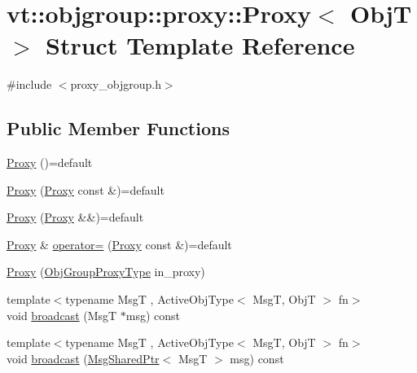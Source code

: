 \hypertarget{structvt_1_1objgroup_1_1proxy_1_1_proxy}{}\section{vt\+:\+:objgroup\+:\+:proxy\+:\+:Proxy$<$ ObjT $>$ Struct Template Reference}
\label{structvt_1_1objgroup_1_1proxy_1_1_proxy}


{\ttfamily \#include $<$proxy\+\_\+objgroup.\+h$>$}

\subsection*{Public Member Functions}
\begin{DoxyCompactItemize}
\item 
\hyperlink{structvt_1_1objgroup_1_1proxy_1_1_proxy_a5450776d9cabb2556765c0d0227c9589}{Proxy} ()=default
\item 
\hyperlink{structvt_1_1objgroup_1_1proxy_1_1_proxy_ad12a9b75a3c4844144d7a159b11af5ec}{Proxy} (\hyperlink{structvt_1_1objgroup_1_1proxy_1_1_proxy}{Proxy} const \&)=default
\item 
\hyperlink{structvt_1_1objgroup_1_1proxy_1_1_proxy_a8711a58bb0444c24553527b6ed9d0cfb}{Proxy} (\hyperlink{structvt_1_1objgroup_1_1proxy_1_1_proxy}{Proxy} \&\&)=default
\item 
\hyperlink{structvt_1_1objgroup_1_1proxy_1_1_proxy}{Proxy} \& \hyperlink{structvt_1_1objgroup_1_1proxy_1_1_proxy_a2fb8dafa11b8c8f70888118bdc2f1b60}{operator=} (\hyperlink{structvt_1_1objgroup_1_1proxy_1_1_proxy}{Proxy} const \&)=default
\item 
\hyperlink{structvt_1_1objgroup_1_1proxy_1_1_proxy_ab76d59446c73ebf1cea9c80fd70fbd6b}{Proxy} (\hyperlink{namespacevt_ad7cae989df485fccca57f0792a880a8e}{Obj\+Group\+Proxy\+Type} in\+\_\+proxy)
\item 
{\footnotesize template$<$typename MsgT , Active\+Obj\+Type$<$ Msg\+T, Obj\+T $>$ fn$>$ }\\void \hyperlink{structvt_1_1objgroup_1_1proxy_1_1_proxy_a0b716ca776b1f06e0d7d45afbe9e5274}{broadcast} (MsgT $\ast$msg) const
\item 
{\footnotesize template$<$typename MsgT , Active\+Obj\+Type$<$ Msg\+T, Obj\+T $>$ fn$>$ }\\void \hyperlink{structvt_1_1objgroup_1_1proxy_1_1_proxy_ad3841e2db7085583868956d97c537ffc}{broadcast} (\hyperlink{namespacevt_ab2b3d506ec8e8d1540aede826d84a239}{Msg\+Shared\+Ptr}$<$ MsgT $>$ msg) const

\end{DoxyCompactItemize}
